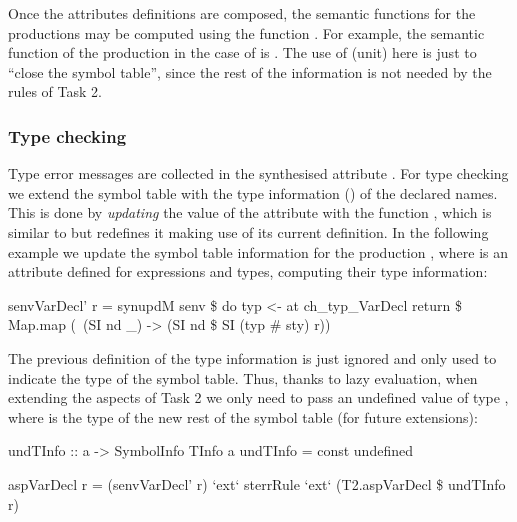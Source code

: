 Once the attributes definitions are composed, the semantic functions for the productions may be computed using the function .
For example, the semantic function of the production  in the case of  
is . The use of \texthaskell{()} (unit) here is just to ``close the symbol table'',
since the rest of the information is not needed by the rules of Task 2.

\subsubsection{Type checking}

Type error messages are collected in the synthesised attribute .
For type checking we extend the symbol table with the type information () of the declared names.
This is done by \emph{updating} the value of the attribute  with the function , 
which is similar to  but redefines it making use of its current definition. 
In the following example we update the symbol table information for the production ,
where  is an attribute defined for expressions and types, computing their type information:
\begin{haskell}
senvVarDecl' r = synupdM senv \$ do 
        typ <- at ch_typ_VarDecl
        return \$ Map.map (\ (SI nd _) -> (SI nd \$ SI (typ # sty) r))
\end{haskell}
The previous definition of the type information is just ignored and only used to indicate the type of the symbol table.
Thus, thanks to lazy evaluation, when extending the aspects of Task 2 we only need to pass  an undefined value of type , 
where  is the type of the new rest of the symbol table (for future extensions):
\begin{haskell}
undTInfo :: a -> SymbolInfo TInfo a
undTInfo = const undefined

aspVarDecl r = (senvVarDecl' r) `ext` sterrRule `ext` 
               (T2.aspVarDecl \$ undTInfo r)
\end{haskell}

